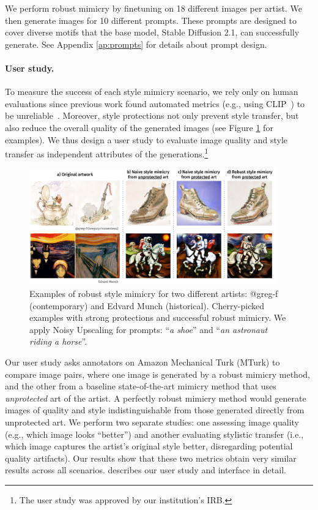 \documentclass{article}
\begin{document}
We perform robust mimicry by finetuning on 18 different images per artist. We then generate images for 10 different prompts. These prompts are designed to cover diverse motifs that the base model, Stable Diffusion 2.1, can successfully generate. See Appendix \ref{ap:prompts} for details about prompt design.

\paragraph{User study.}
To measure the success of each style mimicry scenario, we rely only on human evaluations since previous work found automated metrics (e.g., using CLIP~\citep{radford2021learning}) to be unreliable~\citep{glaze,glazeresponsetoimpress}. Moreover, style protections not only prevent style transfer, but also reduce the overall quality of the generated images (see Figure \ref{fig:examplesmimicry} for examples). We thus design a user study to evaluate image quality and style transfer as independent attributes of the generations.\footnote{The user study was approved by %
our institution's IRB.}







\begin{figure}[t]
    \centering
    \includegraphics[width=0.95\textwidth]{plots/examples.pdf}
    \caption{Examples of robust style mimicry for two different artists: @greg-f (contemporary) and Edvard Munch (historical). Cherry-picked examples with strong protections and successful robust mimicry. We apply Noisy Upscaling for prompts: ``\textit{a shoe}'' and ``\textit{an astronaut riding a horse}''.}
    \label{fig:examplesmimicry}
\end{figure}

Our user study asks annotators on  Amazon Mechanical Turk (MTurk) to compare image pairs, where one image is generated by a robust mimicry method, and the other from a baseline state-of-the-art mimicry method that uses \emph{unprotected} art of the artist. A perfectly robust mimicry method would generate images of quality and style indistinguishable from those generated directly from unprotected art. We perform two separate studies: one assessing image quality (e.g., which image looks ``better'') and another evaluating stylistic transfer (i.e., which image captures the artist's original style better, disregarding potential quality artifacts). Our results show that these two metrics obtain very similar results across all scenarios.  describes our user study and interface in detail.
\end{document}
